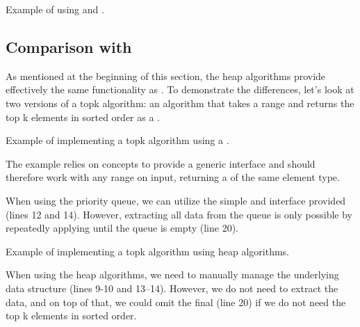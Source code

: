 \begin{box-note}
\footnotesize Example of using  and .
\tcblower
{}
\end{box-note}

\subsection{Comparison with \texorpdfstring{}{\texttt{std::priority\_queue}}}

As mentioned at the beginning of this section, the heap algorithms provide effectively the same functionality as . To demonstrate the differences, let's look at two versions of a topk algorithm: an algorithm that takes a range and returns the top k elements in sorted order as a .

\begin{box-note}
\footnotesize Example of implementing a topk algorithm using a .
\tcblower
{}
\end{box-note}

The example relies on  concepts to provide a generic interface and should therefore work with any range on input, returning a  of the same element type.

When using the priority queue, we can utilize the simple  and  interface provided (lines 12 and 14). However, extracting all data from the queue is only possible by repeatedly applying  until the queue is empty (line 20).

\begin{box-note}
\footnotesize Example of implementing a topk algorithm using heap algorithms.
\tcblower
{}
\end{box-note}

When using the heap algorithms, we need to manually manage the underlying data structure (lines 9-10 and 13–14). However, we do not need to extract the data, and on top of that, we could omit the final  (line 20) if we do not need the top k elements in sorted order.